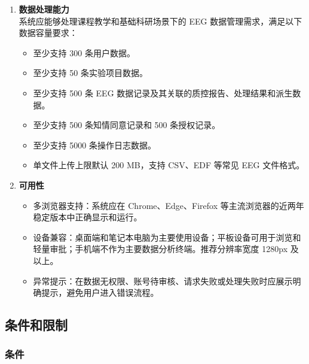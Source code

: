 \begin{enumerate}[(1)]
  \item \textbf{数据处理能力}\\
      系统应能够处理课程教学和基础科研场景下的 EEG 数据管理需求，满足以下数据容量要求：
    \begin{itemize}
      \item 至少支持 300 条用户数据。
      \item 至少支持 50 条实验项目数据。
      \item 至少支持 500 条 EEG 数据记录及其关联的质控报告、处理结果和派生数据。
      \item 至少支持 500 条知情同意记录和 500 条授权记录。
      \item 至少支持 5000 条操作日志数据。
      \item 单文件上传上限默认 200 MB，支持 CSV、EDF 等常见 EEG 文件格式。
    \end{itemize}

  \item \textbf{可用性}
    \begin{itemize}
      \item 多浏览器支持：系统应在 Chrome、Edge、Firefox 等主流浏览器的近两年稳定版本中正确显示和运行。
      \item 设备兼容：桌面端和笔记本电脑为主要使用设备；平板设备可用于浏览和轻量审批；手机端不作为主要数据分析终端。推荐分辨率宽度 1280px 及以上。
      \item 异常提示：在数据无权限、账号待审核、请求失败或处理失败时应展示明确提示，避免用户进入错误流程。
    \end{itemize}
\end{enumerate}

\subsection{条件和限制}

\subsubsection{条件}

